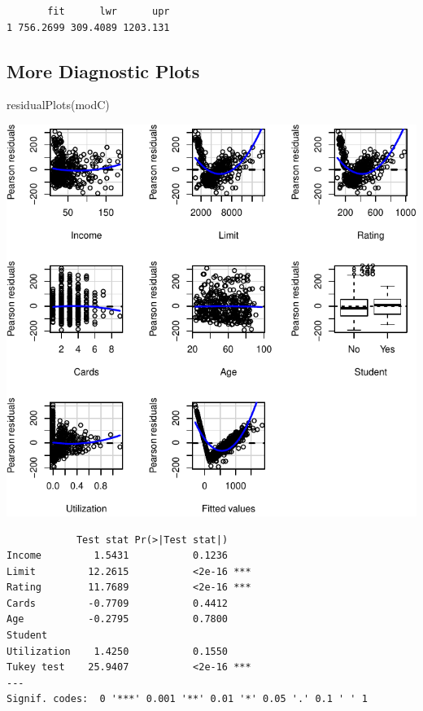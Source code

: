 \documentclass[
]{article}
\newenvironment{Shaded}{\begin{snugshade}}{\end{snugshade}}
\newcommand{\FunctionTok}[1]{\textcolor[rgb]{0.00,0.00,0.00}{#1}}
\newcommand{\NormalTok}[1]{#1}
\begin{document}
\begin{verbatim}
       fit      lwr      upr
1 756.2699 309.4089 1203.131
\end{verbatim}

\hypertarget{more-diagnostic-plots}{%
\subsection{More Diagnostic Plots}\label{more-diagnostic-plots}}

\begin{Shaded}
\begin{Highlighting}[]
\FunctionTok{residualPlots}\NormalTok{(modC)}
\end{Highlighting}
\end{Shaded}

\begin{center}\includegraphics{SDM-CHAP24_files/figure-latex/DPcar-1} \end{center}

\begin{verbatim}
            Test stat Pr(>|Test stat|)    
Income         1.5431           0.1236    
Limit         12.2615           <2e-16 ***
Rating        11.7689           <2e-16 ***
Cards         -0.7709           0.4412    
Age           -0.2795           0.7800    
Student                                   
Utilization    1.4250           0.1550    
Tukey test    25.9407           <2e-16 ***
---
Signif. codes:  0 '***' 0.001 '**' 0.01 '*' 0.05 '.' 0.1 ' ' 1
\end{verbatim}
\end{document}
